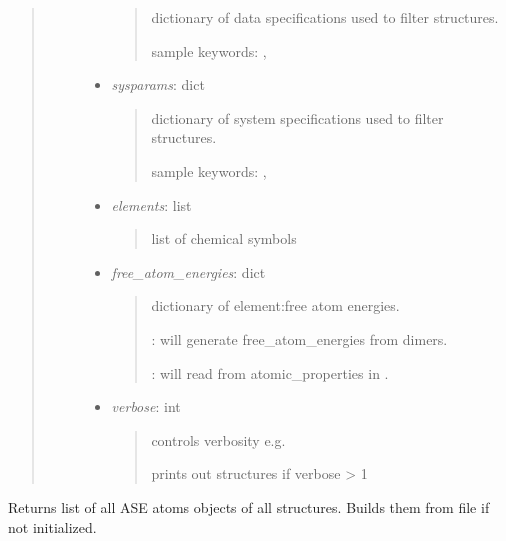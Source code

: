 \documentclass[letterpaper,10pt,english]{sphinxmanual}
\begin{document}
\begin{fulllineitems}
\begin{quote}
\begin{description}
\begin{itemize}
\begin{quote}
dictionary of data specifications used to filter structures.

sample keywords: , 
\end{quote}

\item {} 
\emph{sysparams}: dict
\begin{quote}

dictionary of system specifications used to filter structures.

sample keywords: , 
\end{quote}

\item {} 
\emph{elements}: list
\begin{quote}

list of chemical symbols
\end{quote}

\item {} 
\emph{free\_atom\_energies}: dict
\begin{quote}

dictionary of element:free atom energies.

: will generate free\_atom\_energies from dimers.

: will read from atomic\_properties in .
\end{quote}

\item {} 
\emph{verbose}: int
\begin{quote}

controls verbosity e.g.

prints out structures if verbose \textgreater{} 1
\end{quote}

\end{itemize}

\end{description}\end{quote}

\begin{fulllineitems}
\label{classes:catdata.CATData.get_atoms}
Returns list of all ASE atoms objects of all structures. 
Builds them from file if not initialized.

\end{fulllineitems}



\end{fulllineitems}
\end{document}
